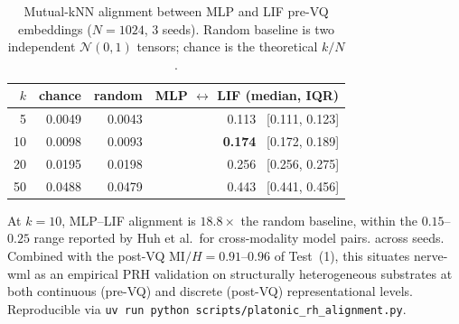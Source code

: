\documentclass[10pt,twocolumn]{article}
\begin{document}
\begin{table}[t]
  \centering
  \caption{Mutual-kNN alignment between MLP and LIF pre-VQ embeddings
  ($N{=}1024$, 3 seeds). Random baseline is two independent
  $\mathcal{N}(0,1)$ tensors; chance is the theoretical $k/N$.}
  \label{tab:platonic-knn}
  \small
  \begin{tabular}{rrrr}
    \hline
    $k$ & chance & random & MLP $\leftrightarrow$ LIF (median, IQR) \\
    \hline
    5  & 0.0049 & 0.0043 & 0.113 \ [0.111, 0.123] \\
    10 & 0.0098 & 0.0093 & \textbf{0.174} \ [0.172, 0.189] \\
    20 & 0.0195 & 0.0198 & 0.256 \ [0.256, 0.275] \\
    50 & 0.0488 & 0.0479 & 0.443 \ [0.441, 0.456] \\
    \hline
  \end{tabular}
\end{table}

At $k{=}10$, MLP--LIF alignment is $18.8\times$ the random baseline, within
the $0.15$--$0.25$ range reported by Huh et al.\ for cross-modality model
pairs.
across seeds. Combined with the post-VQ $\mathrm{MI}/H{=}0.91$--$0.96$ of
Test~(1), this situates nerve-wml as an empirical PRH validation on
structurally heterogeneous substrates at both continuous (pre-VQ) and
discrete (post-VQ) representational levels. Reproducible via
\texttt{uv run python scripts/platonic\_rh\_alignment.py}.
\end{document}
